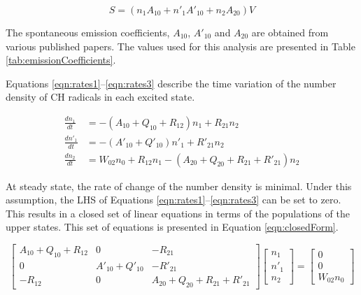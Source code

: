 \begin{equation}
S = ( n_1A_{10} + n'_1A'_{10} + n_2A_{20} )V
\label{eqn:signalIntensity}
\end{equation}

The spontaneous emission coefficients, \(A_{10}\), \(A'_{10}\) and \(A_{20}\) are obtained from various published papers\cite{1985-garland-a,1996-luque-b,2005-richmond}.
The values used for this analysis are presented in Table \ref{tab:emissionCoefficients}.



Equations \ref{eqn:rates1}--\ref{eqn:rates3} describe the time variation of the number density of CH radicals in each excited state.

\begin{align}
\frac{dn_1}{dt} &= -( A_{10} + Q_{10} + R_{12} )n_1 + R_{21}n_2
\label{eqn:rates1}\\
\frac{dn'_1}{dt} &= -( A'_{10} + Q'_{10} )n'_1 + R'_{21}n_2
\label{eqn:rates2}\\
\frac{dn_2}{dt} &= W_{02}n_0 + R_{12}n_1 - ( A_{20} + Q_{20} + R_{21} + R'_{21} )n_2
\label{eqn:rates3}
\end{align}

At steady state, the rate of change of the number density is minimal.
Under this assumption, the LHS of Equations \ref{eqn:rates1}--\ref{eqn:rates3} can be set to zero.
This results in a closed set of linear equations in terms of the populations of the upper states.
This set of equations is presented in Equation \ref{eqn:closedForm}.

\begin{equation}
  \left[
    \begin{matrix}
      A_{10} + Q_{10} + R_{12} & 0 & -R_{21}\\
      0 & A'_{10} + Q'_{10} & -R'_{21}\\
      -R_{12} & 0 & A_{20} + Q_{20} + R_{21} + R'_{21}
    \end{matrix}
  \right]\left[
    \begin{matrix}
      n_1\\
      n'_1\\
      n_2
    \end{matrix}
  \right] = \left[
    \begin{matrix}
      0\\
      0\\
      W_{02}n_0
    \end{matrix}
  \right]
  \label{eqn:closedForm}
\end{equation}

